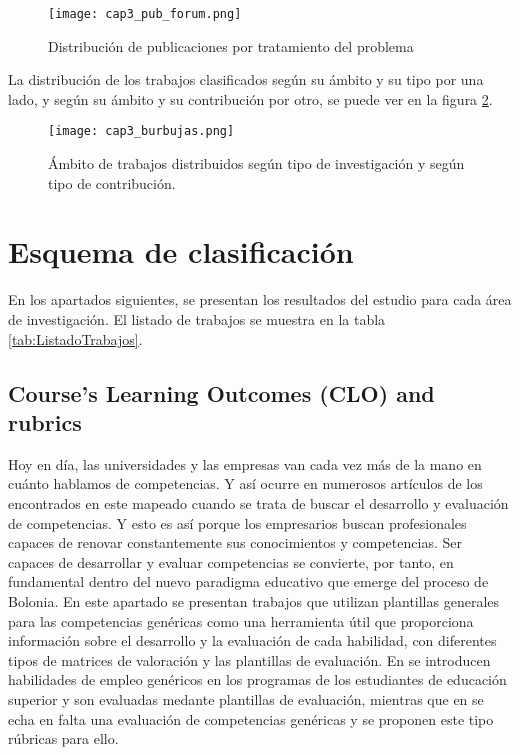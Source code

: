 \begin{figure}[H]
  \begin{center}
    \texttt{[image: cap3\_pub\_forum.png]}
  \end{center}
  \caption{Distribución de publicaciones por tratamiento del problema}
  \label{fig:PublicacionesForum}
\end{figure}


La distribución de los trabajos clasificados según su ámbito y su tipo por una lado, y según su ámbito y su contribución por otro, se puede ver en la figura \ref{fig:Burble}.
\begin{landscape}
\begin{figure}[H]
  \begin{center}
    \texttt{[image: cap3\_burbujas.png]}
  \end{center}
  \caption{Ámbito de trabajos distribuidos según tipo de investigación y según tipo de contribución.}
  \label{fig:Burble}
\end{figure}
\end{landscape}


\section{Esquema de clasificación}

En los apartados siguientes, se presentan los resultados del estudio para cada área de investigación. El listado de trabajos se muestra en la tabla \ref{tab:ListadoTrabajos}.

\subsection{Course’s Learning Outcomes (CLO) and rubrics}
Hoy en día, las universidades y las empresas van cada vez más de la mano en cuánto hablamos de competencias. Y así ocurre en numerosos artículos de los encontrados en este mapeado cuando se trata de buscar el desarrollo y evaluación de competencias. Y esto es así porque los empresarios buscan profesionales capaces de renovar constantemente sus conocimientos y competencias. Ser capaces de desarrollar y evaluar competencias se convierte, por tanto, en fundamental dentro del nuevo paradigma educativo que emerge del proceso de Bolonia. En este apartado se presentan trabajos que utilizan plantillas generales para las competencias genéricas como una herramienta útil que proporciona información sobre el desarrollo y la evaluación de cada habilidad, con diferentes tipos de matrices de valoración y las plantillas de evaluación. En \cite{Terron-Lopez:2013} se introducen habilidades de empleo genéricos en los programas de los estudiantes de educación superior y son evaluadas medante plantillas de evaluación, mientras que en \cite{Feldt:2009} se echa en falta una evaluación de competencias genéricas y se proponen este tipo rúbricas para ello.

